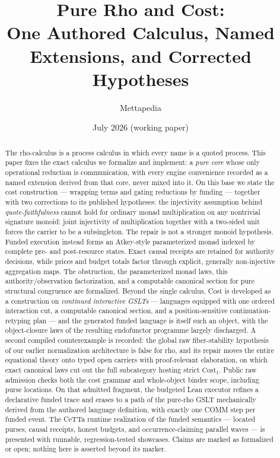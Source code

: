 \documentclass[11pt]{article}
\title{Pure Rho and Cost:\\
One Authored Calculus, Named Extensions, and Corrected Hypotheses}
\author{Mettapedia}
\date{July 2026 (working paper)}
\begin{document}
\maketitle

\begin{abstract}
The rho-calculus is a process calculus in which every name is a quoted
process. This paper fixes the exact calculus we formalize and implement: a
\emph{pure core} whose only operational reduction is communication, with
every engine convenience recorded as a named extension derived from that
core, never mixed into it. On this base we state the cost construction ---
wrapping terms and gating reductions by funding --- together with two
corrections to its published hypotheses: the injectivity assumption behind
\emph{quote-faithfulness} cannot hold for ordinary monad multiplication on
any nontrivial signature monoid: joint injectivity of multiplication together
with a two-sided unit forces the carrier to be a subsingleton.  The repair is
not a stronger monoid hypothesis.  Funded execution instead forms an
Atkey-style parameterized monad indexed by complete pre- and post-resource
states.  Exact causal receipts are retained for authority decisions, while
prices and budget totals factor through explicit, generally non-injective
aggregation maps.  The obstruction, the parameterized monad laws, this
authority/observation factorization, and a computable canonical section for
pure structural congruence are formalized.  Beyond the single calculus, Cost
is developed as a construction on \emph{continued interactive GSLTs} ---
languages equipped with one ordered interaction cut, a computable canonical
section, and a position-sensitive continuation-retyping plan --- and the
generated funded language is itself such an object, with the object-closure
laws of the resulting endofunctor programme largely discharged.  A second
compiled counterexample is recorded: the global raw fiber-stability
hypothesis of our earlier normalization architecture is false for rho, and
its repair moves the entire equational theory onto typed open carriers with
proof-relevant elaboration, on which exact canonical laws cut out the full
subcategory hosting strict $\mathrm{Cost}_1$.  Public raw admission checks
both the cost grammar and whole-object binder scope, including purse
locations.  On that admitted fragment, the budgeted Lean executor refines a
declarative funded trace and erases to a path of the pure-rho GSLT
mechanically derived from the authored language definition, with exactly one
COMM step per funded event.  The CeTTa runtime realization of the funded
semantics --- located purses, causal receipts, honest budgets, and
occurrence-claiming parallel waves --- is presented with runnable,
regression-tested showcases.  Claims are marked as formalized or open;
nothing here is asserted beyond its marker.
\end{abstract}
\end{document}
